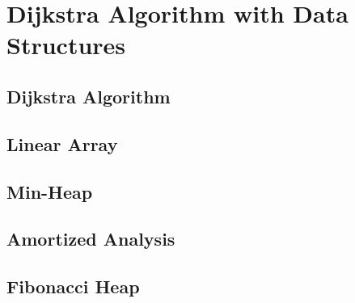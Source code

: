 \chapter{Dijkstra Algorithm with Data Structures}

\section{Dijkstra Algorithm}

\section{Linear Array}

\section{Min-Heap}

\section{Amortized Analysis}

\section{Fibonacci Heap}
